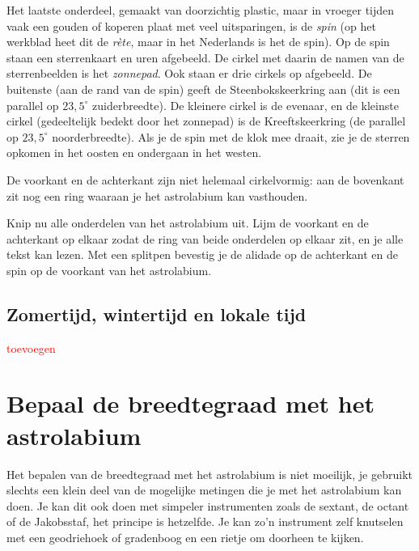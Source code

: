 Het laatste onderdeel, gemaakt van doorzichtig plastic, maar in vroeger tijden vaak een gouden of koperen plaat met veel uitsparingen, is de \textit{spin} (op het werkblad heet dit de \textit{r\`ete}, maar in het Nederlands is het de spin). Op de spin staan een sterrenkaart en uren afgebeeld. De cirkel met daarin de namen van de sterrenbeelden is het \textit{zonnepad}. Ook staan er drie cirkels op afgebeeld. De buitenste (aan de rand van de spin) geeft de Steenbokskeerkring aan (dit is een parallel op $23,5^{\circ}$ zuiderbreedte).  De kleinere cirkel is de evenaar, en de kleinste cirkel (gedeeltelijk bedekt door het zonnepad) is de Kreeftskeerkring (de parallel op $23,5^{\circ}$ noorderbreedte). Als je de spin met de klok mee draait, zie je de sterren opkomen in het oosten en ondergaan in het westen.

De voorkant en de achterkant zijn niet helemaal cirkelvormig: aan de bovenkant zit nog een ring waaraan je het astrolabium kan vasthouden.

\begin{opgave}[\schaar]
 Knip nu alle onderdelen van het astrolabium uit. Lijm de voorkant en de achterkant op elkaar zodat de ring van beide onderdelen op elkaar zit, en je alle tekst kan lezen. Met een splitpen bevestig je de alidade op de achterkant en de spin op de voorkant van het astrolabium.
\end{opgave}

\subsection*{Zomertijd, wintertijd en lokale tijd}
\textcolor{red}{toevoegen}

\section{Bepaal de breedtegraad met het astrolabium}
Het bepalen van de breedtegraad met het astrolabium is niet moeilijk, je gebruikt slechts een klein deel van de mogelijke metingen die je met het astrolabium kan doen. Je kan dit ook doen met simpeler instrumenten zoals de sextant, de octant of de Jakobsstaf, het principe is hetzelfde. Je kan zo'n instrument zelf knutselen met een geodriehoek of gradenboog en een rietje om doorheen te kijken.


